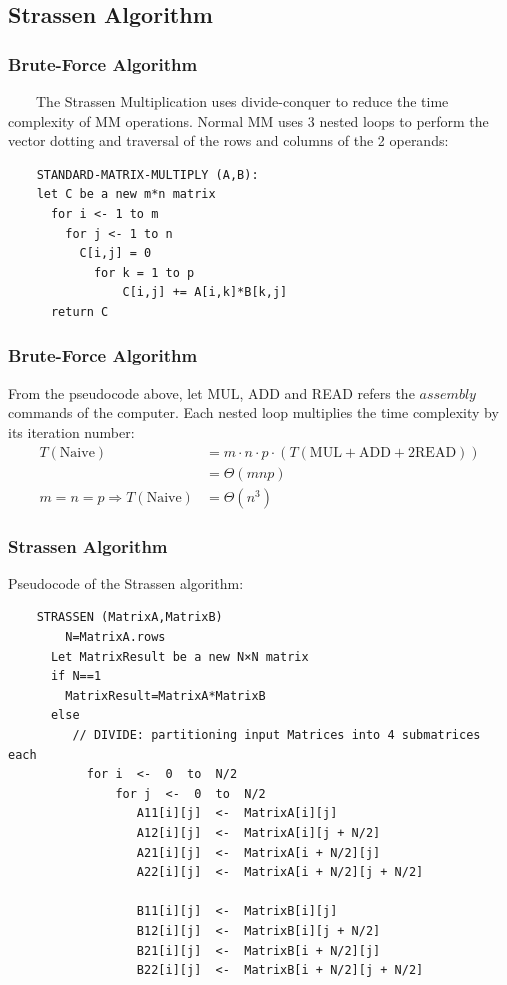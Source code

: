 \documentclass[cjk]{beamer}
\begin{document}
\subsection{Strassen Algorithm}
\begin{frame}[fragile]
  \frametitle{\textbf{Brute-Force Algorithm}}
  ~~~~The Strassen Multiplication uses divide-conquer to reduce the time complexity of MM operations.
  Normal MM uses 3 nested loops to perform the vector dotting and traversal of the rows and columns of the 2 operands:
  \begin{lstlisting}
    STANDARD-MATRIX-MULTIPLY (A,B):
    let C be a new m*n matrix
      for i <- 1 to m
        for j <- 1 to n
          C[i,j] = 0
            for k = 1 to p
                C[i,j] += A[i,k]*B[k,j]
      return C
  \end{lstlisting}
\end{frame}
\begin{frame}
  \frametitle{\textbf{Brute-Force Algorithm}}

  From the pseudocode above, let MUL, ADD and READ refers the \(assembly\) commands of the computer.
  Each nested loop multiplies the time complexity by its iteration number:
  \begin{equation}
    \begin{aligned}
      T(\text{Naive})                  & =m\cdot n\cdot p\cdot (T(\text{MUL}+\text{ADD}+2\text{READ})) \\
                                       & =\Theta(mnp)                                                  \\
      m=n=p\Rightarrow T(\text{Naive}) & =\Theta(n^{3})
    \end{aligned}
  \end{equation}

\end{frame}
\begin{frame}[fragile]
  \frametitle{\textbf{Strassen Algorithm}}
  Pseudocode of the Strassen algorithm:
  \begin{lstlisting}
    STRASSEN (MatrixA,MatrixB)
        N=MatrixA.rows
      Let MatrixResult be a new N×N matrix
      if N==1
        MatrixResult=MatrixA*MatrixB
      else
         // DIVIDE: partitioning input Matrices into 4 submatrices each
           for i  <-  0  to  N/2
               for j  <-  0  to  N/2
                  A11[i][j]  <-  MatrixA[i][j]
                  A12[i][j]  <-  MatrixA[i][j + N/2]
                  A21[i][j]  <-  MatrixA[i + N/2][j]
                  A22[i][j]  <-  MatrixA[i + N/2][j + N/2]

                  B11[i][j]  <-  MatrixB[i][j]
                  B12[i][j]  <-  MatrixB[i][j + N/2]
                  B21[i][j]  <-  MatrixB[i + N/2][j]
                  B22[i][j]  <-  MatrixB[i + N/2][j + N/2]
  \end{lstlisting}
\end{frame}
\end{document}
